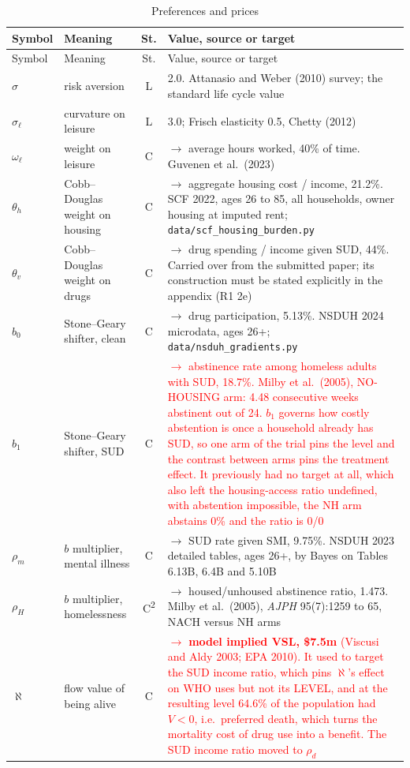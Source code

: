 \documentclass[11pt]{article}
\newcommand{\nw}[1]{\textcolor{red}{#1}}
\begin{document}
\begin{longtable}{lL{3.8cm}cL{5.8cm}}
\caption{Preferences and prices}\\
\toprule
Symbol & Meaning & St. & Value, source or target\\
\midrule
\endfirsthead
\toprule
Symbol & Meaning & St. & Value, source or target\\
\midrule
\endhead
$\sigma$ & risk aversion & L & 2.0. Attanasio and Weber (2010) survey; the standard life cycle value\\
$\sigma_{\ell}$ & curvature on leisure & L & 3.0; Frisch elasticity 0.5, Chetty (2012)\\
$\omega_{\ell}$ & weight on leisure & C & $\rightarrow$ average hours worked, 40\% of time. Guvenen et al.\ (2023)\\
$\theta_h$ & Cobb--Douglas weight on housing & C & $\rightarrow$ aggregate housing cost / income, 21.2\%. SCF 2022, ages 26 to 85, all households, owner housing at imputed rent; \texttt{data/scf\_housing\_burden.py}\\
$\theta_v$ & Cobb--Douglas weight on drugs & C & $\rightarrow$ drug spending / income given SUD, 44\%. Carried over from the submitted paper; its construction must be stated explicitly in the appendix (R1 2e)\\
$b_0$ & Stone--Geary shifter, clean & C & $\rightarrow$ drug participation, 5.13\%. NSDUH 2024 microdata, ages 26+; \texttt{data/nsduh\_gradients.py}\\
$b_1$ & Stone--Geary shifter, SUD & C & \nw{$\rightarrow$ abstinence rate among homeless adults with SUD, 18.7\%. Milby et al.\ (2005), NO-HOUSING arm: 4.48 consecutive weeks abstinent out of 24. $b_1$ governs how costly abstention is once a household already has SUD, so one arm of the trial pins the level and the contrast between arms pins the treatment effect. It previously had no target at all, which also left the housing-access ratio undefined, with abstention impossible, the NH arm abstains 0\% and the ratio is 0/0}\\
$\rho_m$ & $b$ multiplier, mental illness & C & $\rightarrow$ SUD rate given SMI, 9.75\%. NSDUH 2023 detailed tables, ages 26+, by Bayes on Tables 6.13B, 6.4B and 5.10B\\
$\rho_H$ & $b$ multiplier, homelessness & C\textsuperscript{2} & $\rightarrow$ housed/unhoused abstinence ratio, 1.473. Milby et al.\ (2005), \emph{AJPH} 95(7):1259 to 65, NACH versus NH arms\\
$\aleph$ & flow value of being alive & C & \nw{$\rightarrow$ \textbf{model implied VSL, \$7.5m} (Viscusi and Aldy 2003; EPA 2010). It used to target the SUD income ratio, which pins $\aleph$'s effect on WHO uses but not its LEVEL, and at the resulting level 64.6\% of the population had $V<0$, i.e.\ preferred death, which turns the mortality cost of drug use into a benefit. The SUD income ratio moved to $\rho_d$}\\

\end{longtable}
\end{document}
